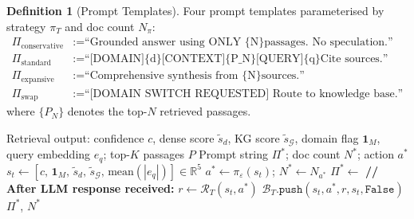 \documentclass[12pt,a4paper]{article}
\theoremstyle{definition}
\newtheorem{definition}{Definition}[section]
\theoremstyle{plain}
\theoremstyle{remark}
\newcommand{\R}{\mathbb{R}}
\newcommand{\KG}{\mathcal{G}}
\begin{document}
\begin{definition}[Prompt Templates]
\label{def:prompt_templates}
Four prompt templates parameterised by strategy $\pi_T$ and doc count $N_\pi$:
\begin{align*}
\Pi_{\text{conservative}} &:= \text{``Grounded answer using ONLY \{N\} passages. No speculation.''}\\
\Pi_{\text{standard}}     &:= \text{``[DOMAIN]\{d\}[CONTEXT]\{P_N\}[QUERY]\{q\} Cite sources.''}\\
\Pi_{\text{expansive}}    &:= \text{``Comprehensive synthesis from \{N\} sources.''}\\
\Pi_{\text{swap}}         &:= \text{``[DOMAIN SWITCH REQUESTED] Route to knowledge base.''}
\end{align*}
where $\{P_N\}$ denotes the top-$N$ retrieved passages.
\end{definition}

\begin{algorithm}[H]
\caption{RL-Text Prompt Policy --- Action Selection and Feedback}
\label{alg:rl_text}
\begin{algorithmic}[1]
\Require Retrieval output: confidence $c$, dense score $\tilde{s}_d$,
         KG score $\tilde{s}_\KG$, domain flag $\mathbf{1}_M$,
         query embedding $e_q$; top-$K$ passages $P$
\Ensure Prompt string $\Pi^*$; doc count $N^*$; action $a^*$
\State $s_t \gets [c,\,\mathbf{1}_M,\,\tilde{s}_d,\,\tilde{s}_\KG,\,
       \text{mean}(|e_q|)] \in \R^5$
\State $a^* \gets \pi_\varepsilon(s_t)$;
       \quad $N^* \gets N_{a^*}$
\State $\Pi^* \gets$ 
\State \textbf{// After LLM response received:}
\State $r \gets \mathcal{R}_T(s_t, a^*)$
\State $\mathcal{B}_T.\texttt{push}(s_t, a^*, r, s_t, \texttt{False})$
\State {}
\State \Return $\Pi^*$, $N^*$
\end{algorithmic}
\end{algorithm}
\end{document}
